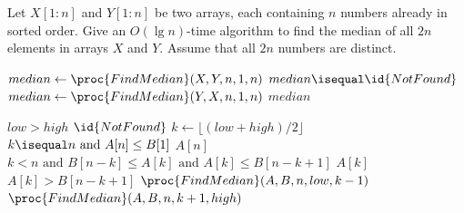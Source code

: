 \item[\textbf{Exercise 9.3-10}]
Let $X[1 : n]$ and $Y[1 : n]$ be two arrays, each containing $n$ numbers already
in sorted order. Give an $O(\lg n)$-time algorithm to find the median of all
$2n$ elements in arrays $X$ and $Y$. Assume that all $2n$ numbers are distinct.

\Solution

\begin{codebox}
\li $median \gets \proc{FindMedian}(X, Y, n, 1, n)$
\li
\li \If $median \isequal \id{NotFound}$ \Then
\li     $median \gets \proc{FindMedian}(Y, X, n, 1, n)$
    \End
\li
\li \Return $median$
\end{codebox}


\begin{codebox}
\li \If $low > high$ \Then
\li     \Return $\id{NotFound}$
    \End
\li
\li $k \gets \lfloor(low + high) / 2 \rfloor$
\li
\li \If $k \isequal n \text{ and } A[n] \le B[1]$ \Then
\li     \Return $A[n]$
    \End
\li
\li \If $k < n \text{ and } B[n - k] \le A[k] \text{ and } A[k] \le B[n - k + 1]$ \Then
\li     \Return $A[k]$
    \End
\li
\li \If $A[k] > B[n - k + 1]$ \Then
\li     \Return $\proc{FindMedian}(A, B, n, low, k - 1)$
    \End
\li
\li \Return $\proc{FindMedian}(A, B, n, k + 1, high)$
\end{codebox}

